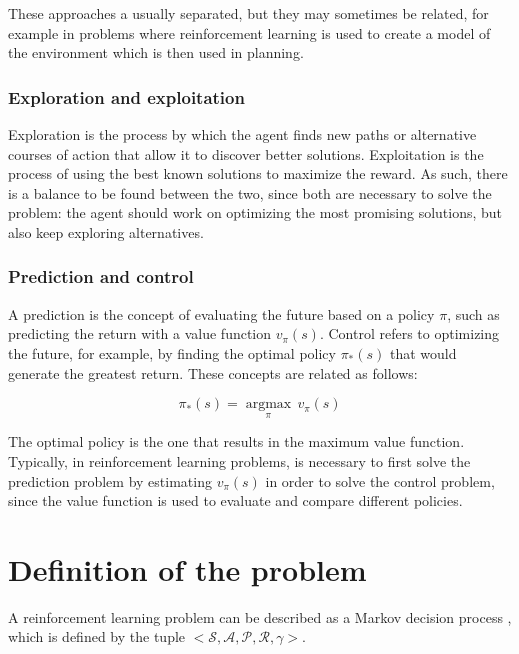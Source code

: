 These approaches a usually separated, but they may sometimes be related, for example in problems where reinforcement learning is used to create a model of the environment which is then used in planning.

\subsubsection*{Exploration and exploitation}

Exploration is the process by which the agent finds new paths or alternative courses of action that allow it to discover better solutions. Exploitation is the process of using the best known solutions to maximize the reward. As such, there is a balance to be found between the two, since both are necessary to solve the problem: the agent should work on optimizing the most promising solutions, but also keep exploring alternatives.

\subsubsection*{Prediction and control}

A prediction is the concept of evaluating the future based on a policy $\pi$, such as predicting the return with a value function $v_\pi(s)$. Control refers to optimizing the future, for example, by finding the optimal policy $\pi_\ast(s)$ that would generate the greatest return. These concepts are related as follows:

\begin{equation}
    \pi_\ast(s) = \underset{\pi}{\operatorname{argmax}}\,v_\pi(s)
\end{equation}

The optimal policy is the one that results in the maximum value function. Typically, in reinforcement learning problems, is necessary to first solve the prediction problem by estimating $v_\pi(s)$ in order to solve the control problem, since the value function is used to evaluate and compare different policies.

\section{Definition of the problem}

A reinforcement learning problem can be described as a Markov decision process \cite{Sutton:2018}, which is defined by the tuple $<\mathcal{S}, \mathcal{A},\mathcal{P},\mathcal{R},\gamma>$.

